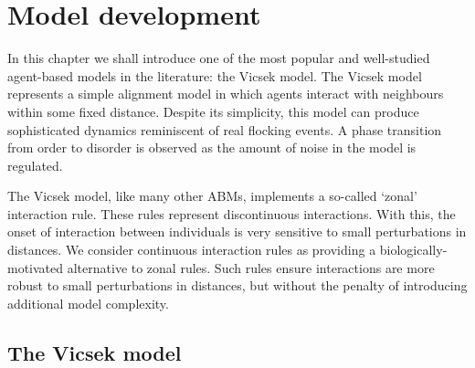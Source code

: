 \graphicspath{{fig/model_development/}}

\chapter{Model development}
\label{cha:model_dev}

In this chapter we shall introduce one of the most popular and well-studied
agent-based models in the literature: the Vicsek model. The Vicsek model
represents a simple alignment model in which agents interact with neighbours
within some fixed distance. Despite its simplicity, this model can produce
sophisticated dynamics reminiscent of real flocking events. A phase transition
from order to disorder is observed as the amount of noise in the model is
regulated.

The Vicsek model, like many other ABMs, implements a so-called `zonal'
interaction rule. These rules represent discontinuous interactions. With this,
the onset of interaction between individuals is very sensitive to small
perturbations in distances. We consider continuous interaction rules as
providing a biologically-motivated alternative to zonal rules. Such rules
ensure interactions are more robust to small perturbations in distances, but
without the penalty of introducing additional model complexity.

\section{The Vicsek model}
\label{sec:vicsek_model}

